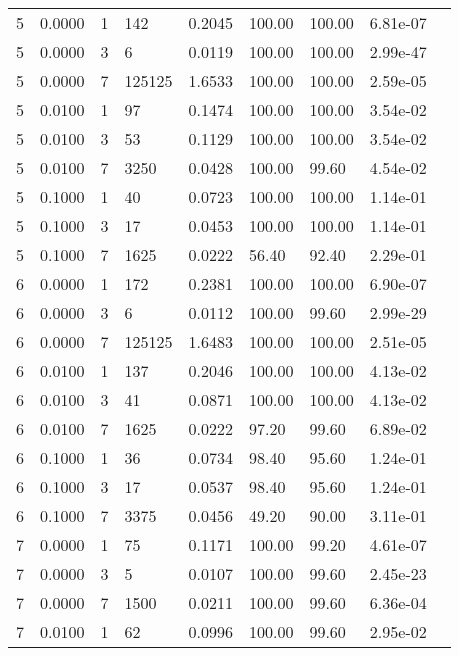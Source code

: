 \begin{longtable}{@{}lllllllll@{}}
5           & 0.0000 & 1   & 142    & 0.2045 & 100.00  & 100.00  & 6.81e-07  &  \\
5           & 0.0000 & 3   & 6      & 0.0119 & 100.00  & 100.00  & 2.99e-47  &  \\
5           & 0.0000 & 7   & 125125 & 1.6533 & 100.00  & 100.00  & 2.59e-05  &  \\
5           & 0.0100 & 1   & 97     & 0.1474 & 100.00  & 100.00  & 3.54e-02  &  \\
5           & 0.0100 & 3   & 53     & 0.1129 & 100.00  & 100.00  & 3.54e-02  &  \\
5           & 0.0100 & 7   & 3250   & 0.0428 & 100.00  & 99.60   & 4.54e-02  &  \\
5           & 0.1000 & 1   & 40     & 0.0723 & 100.00  & 100.00  & 1.14e-01  &  \\
5           & 0.1000 & 3   & 17     & 0.0453 & 100.00  & 100.00  & 1.14e-01  &  \\
5           & 0.1000 & 7   & 1625   & 0.0222 & 56.40   & 92.40   & 2.29e-01  &  \\
6           & 0.0000 & 1   & 172    & 0.2381 & 100.00  & 100.00  & 6.90e-07  &  \\
6           & 0.0000 & 3   & 6      & 0.0112 & 100.00  & 99.60   & 2.99e-29  &  \\
6           & 0.0000 & 7   & 125125 & 1.6483 & 100.00  & 100.00  & 2.51e-05  &  \\
6           & 0.0100 & 1   & 137    & 0.2046 & 100.00  & 100.00  & 4.13e-02  &  \\
6           & 0.0100 & 3   & 41     & 0.0871 & 100.00  & 100.00  & 4.13e-02  &  \\
6           & 0.0100 & 7   & 1625   & 0.0222 & 97.20   & 99.60   & 6.89e-02  &  \\
6           & 0.1000 & 1   & 36     & 0.0734 & 98.40   & 95.60   & 1.24e-01  &  \\
6           & 0.1000 & 3   & 17     & 0.0537 & 98.40   & 95.60   & 1.24e-01  &  \\
6           & 0.1000 & 7   & 3375   & 0.0456 & 49.20   & 90.00   & 3.11e-01  &  \\
7           & 0.0000 & 1   & 75     & 0.1171 & 100.00  & 99.20   & 4.61e-07  &  \\
7           & 0.0000 & 3   & 5      & 0.0107 & 100.00  & 99.60   & 2.45e-23  &  \\
7           & 0.0000 & 7   & 1500   & 0.0211 & 100.00  & 99.60   & 6.36e-04  &  \\
7           & 0.0100 & 1   & 62     & 0.0996 & 100.00  & 99.60   & 2.95e-02  &  \\

\end{longtable}
